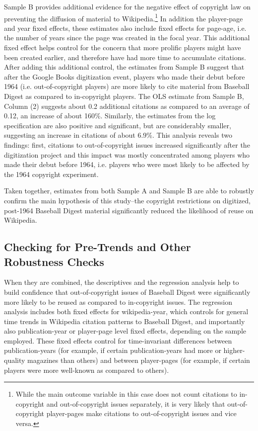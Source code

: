 \documentclass[11pt]{article}
\begin{document}
Sample B provides additional evidence for the negative effect of copyright law on preventing the diffusion of material to Wikipedia.\footnote{While the main outcome variable in this case does not count citations to in-copyright and out-of-copyright issues separately, it is very likely that out-of-copyright player-pages make citations to out-of-copyright issues and vice versa.} In addition the player-page and year fixed effects, these estimates also include fixed effects for page-age, i.e. the number of years since the page was created in the focal year. This additional fixed effect helps control for the concern that more prolific players might have been created earlier, and therefore have had more time to accumulate citations. After adding this additional control, the estimates from Sample B suggest that after the Google Books digitization event, players who made their debut before 1964 (i.e. out-of-copyright players) are more likely to cite material from Baseball Digest as compared to in-copyright players. The OLS estimate from Sample B, Column (2) suggests about 0.2 additional citations as compared to an average of 0.12, an increase of about 160\%. Similarly, the estimates from the log specification are also positive and significant, but are considerably smaller, suggesting an increase in citations of about 6.9\%. This analysis reveals two findings: first, citations to out-of-copyright issues increased significantly after the digitization project and this impact was mostly concentrated among players who made their debut before 1964, i.e. players who were most likely to be affected by the 1964 copyright experiment.

Taken together, estimates from both Sample A and Sample B are able to robustly confirm the main hypothesis of this study--the copyright restrictions on digitized, post-1964 Baseball Digest material significantly reduced the likelihood of reuse on Wikipedia.

\subsection{Checking for Pre-Trends and Other Robustness Checks}

When they are combined, the descriptives and the regression analysis help to build confidence that out-of-copyright issues of Baseball Digest were significantly more likely to be reused as compared to in-copyright issues. The regression analysis includes both fixed effects for wikipedia-year, which controls for general time trends in Wikipedia citation patterns to Baseball Digest, and importantly also publication-year or player-page level fixed effects, depending on the sample employed. These fixed effects control for time-invariant differences between publication-years (for example, if certain publication-years had more or higher-quality magazines than others) and between player-pages (for example, if certain players were more well-known as compared to others). 
\end{document}
